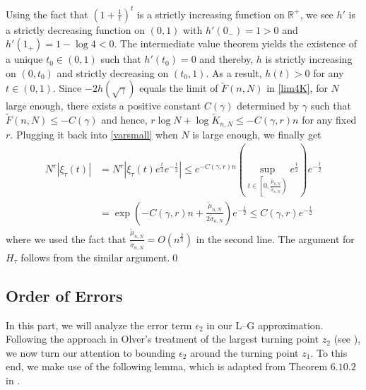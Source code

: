 \documentclass[11pt]{article}
\numberwithin{equation}{section}%
\numberwithin{theorem}{section}
\begin{document}
Using the fact that $\left(1+\frac{1}{t}\right)^t$ is a strictly increasing function on $\mathbb{R}^+$, we see $h'$ is a strictly decreasing function on $(0,1)$ with $h'(0_-)=1>0$ and $h'(1_+)=1-\log 4<0$. The intermediate value theorem yields the existence of a unique $t_0\in(0,1)$ such that $h'(t_0)=0$ and thereby, $h$ is strictly increasing on $(0,t_0)$ and strictly decreasing on $(t_0,1)$. As a result, $h(t)>0$ for any $t\in(0,1)$. Since $-2h(\sqrt\gamma)$ equals the limit of $\tilde{F}(n,N)$ in \eqref{lim4K}, for $N$ large enough, there exists a positive constant $C(\gamma)$ determined by $\gamma$ such that $\tilde{F}(n,N)\le -C(\gamma)$ and hence, $r\log N+\log\tilde{K}_{n,N}\le-C(\gamma,r)n$ for any fixed $r$. Plugging it back into \eqref{varsmall} when $N$ is large enough, we finally get
\begin{equation*}
\begin{split}
       N^r|\xi_{\tau}(t)|&=N^r|\xi_{\tau}(t)e^{\frac{t}{2}}e^{-\frac{t}{2}}|\le e^{-C(\gamma,r)n}\left(\sup_{t\in\left[0,\frac{\tilde{\mu}_{n,N}}{\tilde{\sigma}_{n,N}}\right)}e^{\frac{t}{2}}\right)e^{-\frac{t}{2}}\\
       &=\exp\left(-C(\gamma,r)n+\frac{\tilde{\mu}_{n,N}}{2\tilde{\sigma}_{n,N}}\right)e^{-\frac{t}{2}}\le C(\gamma,r)e^{-\frac{t}{2}}
\end{split}
\end{equation*}
where we used the fact that $\frac{\tilde{\mu}_{n,N}}{\tilde{\sigma}_{n,N}}=O\left(n^\frac{2}{3}\right)$ in the second line. The argument for $H_{\tau}$ follows from the similar argument.\qed

\subsection{Order of Errors}
In this part, we will analyze the error term $\epsilon_2$ in our L--G approximation. Following the approach in Olver's treatment of the largest turning point $z_2$ (see \cite[Chapter $11$]{olver1997asymptotics}), we now turn our attention to bounding $\epsilon_2$ around the turning point $z_1$. To this end, we make use of the following lemma, which is adapted from Theorem $6.10.2$ in \cite{olver1997asymptotics}.
\end{document}

